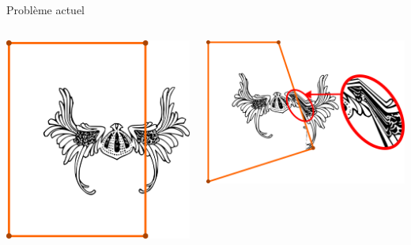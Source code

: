 \documentclass[xcolor=x11names,compress]{beamer}
\renewcommand{\(}{\begin{columns}} \renewcommand{\)}{\end{columns}}
\newcommand{\<}[1]{\begin{column}{#1}} \renewcommand{\>}{\end{column}}
\begin{document}
\begin{frame}{Problème actuel}
\begin{columns}[t]
  \begin{column}{0.5\textwidth}
    \centering
    \includegraphics[scale=0.15]{Deformation-Viking-DoubleCage-Avant}
  \end{column}
  \begin{column}{0.5\textwidth}
    \centering
    \includegraphics[scale=0.15]{Deformation-Viking-DoubleCage-Sans}
  \end{column}
\end{columns}
\end{frame}
\end{document}
